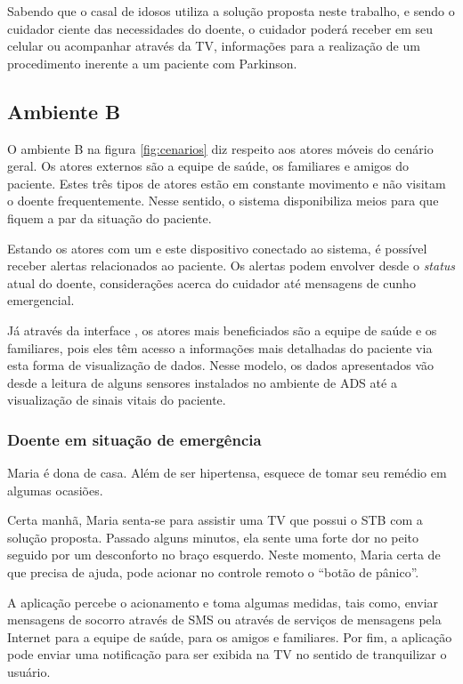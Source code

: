 Sabendo que o casal de idosos utiliza a solução proposta neste trabalho, e
sendo o cuidador ciente das necessidades do doente, o cuidador poderá receber
em seu celular ou acompanhar através da TV, informações para a realização de um
procedimento inerente a um paciente com Parkinson.

\subsection{Ambiente B} \label{subsec:ambiente-b}

O ambiente B na figura \ref{fig:cenarios} diz respeito aos atores móveis do
cenário geral. Os atores externos são a equipe de saúde, os familiares e amigos
do paciente. Estes três tipos de atores estão em constante movimento e não
visitam o doente frequentemente. Nesse sentido, o sistema disponibiliza meios
para que fiquem a par da situação do paciente.

Estando os atores com um \smartphone[] e este dispositivo conectado ao
sistema, é possível receber alertas relacionados ao paciente. Os alertas podem
envolver desde o \textit{status} atual do doente, considerações acerca do
cuidador até mensagens de cunho emergencial.

Já através da interface \web[], os atores mais beneficiados são a equipe de
saúde e os familiares, pois eles têm acesso a informações mais detalhadas do
paciente via esta forma de visualização de dados. Nesse modelo, os dados
apresentados vão desde a leitura de alguns sensores instalados no ambiente de ADS
até a visualização de sinais vitais do paciente.

\subsubsection{Doente em situação de emergência}

Maria é dona de casa. Além de ser hipertensa, esquece de tomar seu remédio em 
algumas ocasiões.

Certa manhã, Maria senta-se para assistir uma TV que possui o STB com a solução
proposta. Passado alguns minutos, ela sente uma forte dor no peito seguido por
um desconforto no braço esquerdo. Neste momento, Maria certa de que precisa de
ajuda, pode acionar no controle remoto o ``botão de pânico''. 

A aplicação percebe o acionamento e toma algumas medidas, tais como, enviar
mensagens de socorro através de SMS ou através de serviços de mensagens pela
Internet para a equipe de saúde, para os amigos e familiares.  Por fim, a
aplicação pode enviar uma notificação para ser exibida na TV no sentido
de tranquilizar o usuário.

